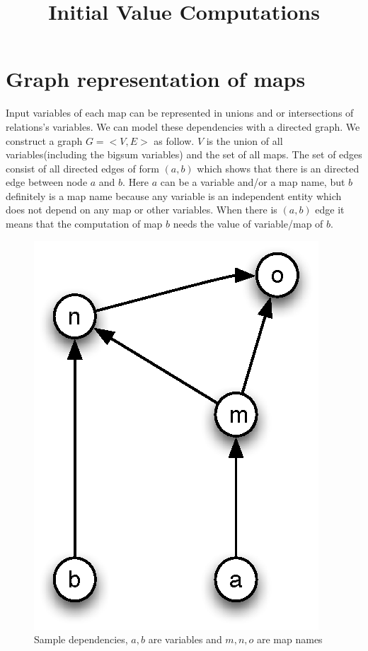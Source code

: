 \documentclass[12pt]{article}
\begin{document}
\title{Initial Value Computations}
\author{}
\date{}
\maketitle
\section{Graph representation of maps}
Input variables of each map can be represented in unions and or intersections of relations's variables. We can model these dependencies with a directed graph. We construct a graph $G=<V,E>$ as follow. $V$ is the union of all variables(including the bigsum variables) and the set of all maps. The set of edges consist of all directed edges of form $(a,b)$ which shows that there is an directed edge between node $a$ and $b$. Here $a$ can be a variable and/or a map name, but $b$ definitely is a map name because any variable is an independent entity which does not depend on any map or other variables. When there is $(a,b)$ edge it means that the computation of map $b$ needs the value of variable/map of $b$. 

\begin{figure}[htbp]
\begin{center}
\includegraphics[scale=0.8]{fig1.eps}
\caption{Sample dependencies, $a,b$ are variables and $m,n,o$ are map names}
\label{fig1}
\end{center}
\end{figure}
\end{document}
